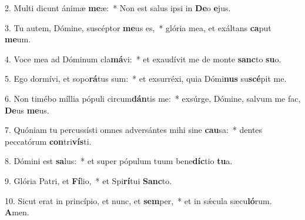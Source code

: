 2. Multi dicunt ánimæ \textbf{me}æ:~*  Non est salus ipsi in \textbf{De}o \textbf{e}jus.\

3. Tu autem, Dómine, suscéptor \textbf{me}us es,~*  glória mea, et exáltans \textbf{ca}put \textbf{me}um.\

4. Voce mea ad Dóminum cla\textbf{má}vi:~*  et exaudívit me de monte \textbf{sanc}to \textbf{su}o.\

5. Ego dormívi, et sopo\textbf{rá}tus sum:~*  et exsurréxi, quia Dómi\textbf{nus} su\textbf{scé}pit me.\

6. Non timébo míllia pópuli circum\textbf{dán}tis me:~*  exsúrge, Dómine, salvum me fac, \textbf{De}us \textbf{me}us.\

7. Quóniam tu percussísti omnes adversántes mihi sine \textbf{cau}sa:~*  dentes peccatórum \textbf{con}tri\textbf{vís}ti.\

8. Dómini est \textbf{sa}lus:~*  et super pópulum tuum bene\textbf{díc}tio \textbf{tu}a.\

9. Glória Patri, et \textbf{Fí}lio,~*  et Spi\textbf{rí}tui \textbf{Sanc}to.\

10. Sicut erat in princípio, et nunc, et \textbf{sem}per,~*  et in sǽcula sæcu\textbf{ló}rum. \textbf{A}men.\

